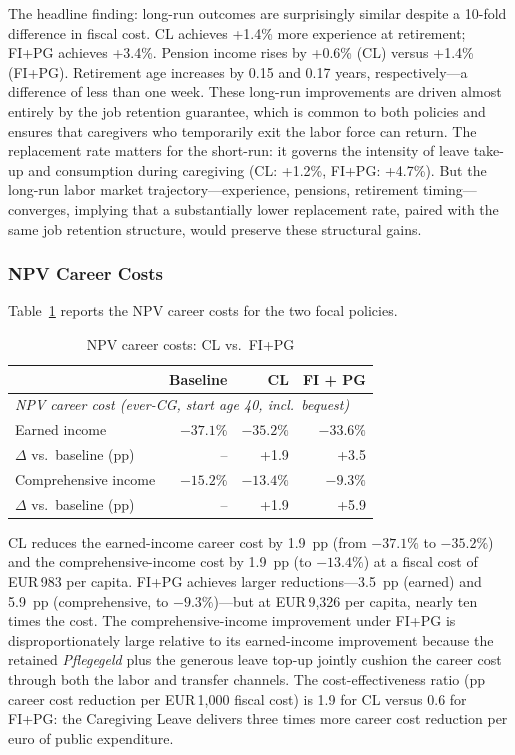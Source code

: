 The headline finding: long-run outcomes are surprisingly similar despite a 10-fold difference in fiscal cost. CL achieves +1.4\% more experience at retirement; FI+PG achieves +3.4\%. Pension income rises by +0.6\% (CL) versus +1.4\% (FI+PG). Retirement age increases by 0.15 and 0.17 years, respectively---a difference of less than one week. These long-run improvements are driven almost entirely by the job retention guarantee, which is common to both policies and ensures that caregivers who temporarily exit the labor force can return. The replacement rate matters for the short-run: it governs the intensity of leave take-up and consumption during caregiving (CL: +1.2\%, FI+PG: +4.7\%). But the long-run labor market trajectory---experience, pensions, retirement timing---converges, implying that a substantially lower replacement rate, paired with the same job retention structure, would preserve these structural gains.

\subsubsection{NPV Career Costs}

Table~\ref{tab:main_npv} reports the NPV career costs for the two focal policies.

\begin{table}[htbp]
  \centering
  \caption{NPV career costs: CL vs.\ FI+PG}
  \label{tab:main_npv}
  \small
  \begin{tabular}{lrrr}
    \toprule
    & Baseline & CL & FI + PG \\
    \midrule
    \multicolumn{4}{l}{\textit{NPV career cost (ever-CG, start age 40, incl.\ bequest)}} \\
    Earned income & $-37.1\%$ & $-35.2\%$ & $-33.6\%$ \\
    \quad $\Delta$ vs.\ baseline (pp) & -- & +1.9 & +3.5 \\
    Comprehensive income & $-15.2\%$ & $-13.4\%$ & $-9.3\%$ \\
    \quad $\Delta$ vs.\ baseline (pp) & -- & +1.9 & +5.9 \\
    \bottomrule
  \end{tabular}
\end{table}

CL reduces the earned-income career cost by 1.9~pp (from $-37.1\%$ to $-35.2\%$) and the comprehensive-income cost by 1.9~pp (to $-13.4\%$) at a fiscal cost of EUR\,983 per capita. FI+PG achieves larger reductions---3.5~pp (earned) and 5.9~pp (comprehensive, to $-9.3\%$)---but at EUR\,9,326 per capita, nearly ten times the cost. The comprehensive-income improvement under FI+PG is disproportionately large relative to its earned-income improvement because the retained \textit{Pflegegeld} plus the generous leave top-up jointly cushion the career cost through both the labor and transfer channels. The cost-effectiveness ratio (pp career cost reduction per EUR\,1,000 fiscal cost) is 1.9 for CL versus 0.6 for FI+PG: the Caregiving Leave delivers three times more career cost reduction per euro of public expenditure.

